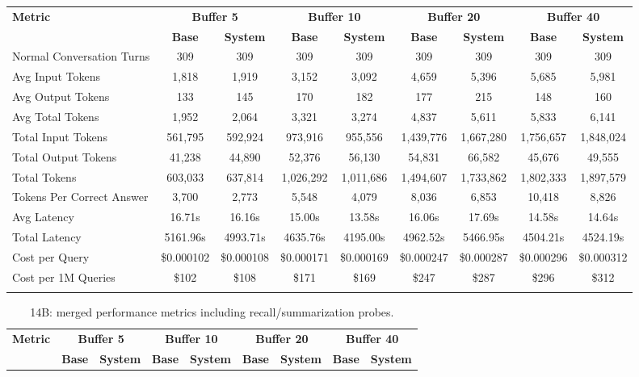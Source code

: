\begin{landscape}
\begin{longtable}{@{}p{3.8cm}cccccccc@{}}
\toprule
\textbf{Metric} & \multicolumn{2}{c}{\textbf{Buffer 5}} & \multicolumn{2}{c}{\textbf{Buffer 10}} & \multicolumn{2}{c}{\textbf{Buffer 20}} & \multicolumn{2}{c}{\textbf{Buffer 40}} \\
\cmidrule(lr){2-3}\cmidrule(lr){4-5}\cmidrule(lr){6-7}\cmidrule(lr){8-9}
 & \textbf{Base} & \textbf{System} & \textbf{Base} & \textbf{System} & \textbf{Base} & \textbf{System} & \textbf{Base} & \textbf{System} \\
\midrule
\endhead
Normal Conversation Turns & 309 & 309 & 309 & 309 & 309 & 309 & 309 & 309 \\
Avg Input Tokens & 1,818 & 1,919 & 3,152 & 3,092 & 4,659 & 5,396 & 5,685 & 5,981 \\
Avg Output Tokens & 133 & 145 & 170 & 182 & 177 & 215 & 148 & 160 \\
Avg Total Tokens & 1,952 & 2,064 & 3,321 & 3,274 & 4,837 & 5,611 & 5,833 & 6,141 \\
Total Input Tokens & 561,795 & 592,924 & 973,916 & 955,556 & 1,439,776 & 1,667,280 & 1,756,657 & 1,848,024 \\
Total Output Tokens & 41,238 & 44,890 & 52,376 & 56,130 & 54,831 & 66,582 & 45,676 & 49,555 \\
Total Tokens & 603,033 & 637,814 & 1,026,292 & 1,011,686 & 1,494,607 & 1,733,862 & 1,802,333 & 1,897,579 \\
Tokens Per Correct Answer & 3,700 & 2,773 & 5,548 & 4,079 & 8,036 & 6,853 & 10,418 & 8,826 \\
Avg Latency & 16.71s & 16.16s & 15.00s & 13.58s & 16.06s & 17.69s & 14.58s & 14.64s \\
Total Latency & 5161.96s & 4993.71s & 4635.76s & 4195.00s & 4962.52s & 5466.95s & 4504.21s & 4524.19s \\
Cost per Query & \$0.000102 & \$0.000108 & \$0.000171 & \$0.000169 & \$0.000247 & \$0.000287 & \$0.000296 & \$0.000312 \\
Cost per 1M Queries & \$102 & \$108 & \$171 & \$169 & \$247 & \$287 & \$296 & \$312 \\
\botrule
\end{longtable}
\begin{longtable}{@{}p{3.8cm}cccccccc@{}}
\caption{14B: merged performance metrics including recall/summarization probes.}\label{tab:app_14b_perf_probe}\\

\toprule
\textbf{Metric} & \multicolumn{2}{c}{\textbf{Buffer 5}} & \multicolumn{2}{c}{\textbf{Buffer 10}} & \multicolumn{2}{c}{\textbf{Buffer 20}} & \multicolumn{2}{c}{\textbf{Buffer 40}} \\
\cmidrule(lr){2-3}\cmidrule(lr){4-5}\cmidrule(lr){6-7}\cmidrule(lr){8-9}
 & \textbf{Base} & \textbf{System} & \textbf{Base} & \textbf{System} & \textbf{Base} & \textbf{System} & \textbf{Base} & \textbf{System} \\
\midrule
\endfirsthead


\end{longtable}
\end{landscape}
